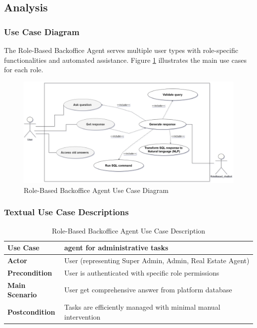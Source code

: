 \subsection{Analysis}
\subsubsection{Use Case Diagram}
The Role-Based Backoffice Agent serves multiple user types with role-specific functionalities and automated assistance. Figure \ref{fig:backoffice-use-case} illustrates the main use cases for each role.

\begin{figure}[htbp]
    \centering
    \includegraphics[width=1\textwidth]{images/backoffice_use_case_diagram.png}
    \caption{Role-Based Backoffice Agent Use Case Diagram}
    \label{fig:backoffice-use-case}
\end{figure}

\subsubsection{Textual Use Case Descriptions}

\begin{table}[htbp]
    \centering
    \begin{tabular}{|p{3cm}|p{10cm}|}
        \hline
        \textbf{Use Case} & \textbf{agent for administrative tasks} \\
        \hline
        \textbf{Actor} & User (representing Super Admin, Admin, Real Estate Agent) \\
        \hline
        \textbf{Precondition} & User is authenticated with specific role permissions \\
        \hline
        \textbf{Main Scenario} & User get comprehensive answer from platform database \\
        \hline
        \textbf{Postcondition} & Tasks are efficiently managed with minimal manual intervention \\
        \hline
    \end{tabular}
    \caption{Role-Based Backoffice Agent Use Case Description}
    \label{tab:backoffice-use-case}
\end{table}
\newpage

